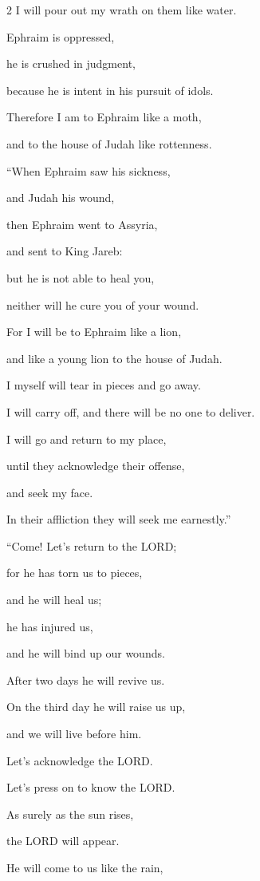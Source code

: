 \begin{multicols}{2}
I will pour out my wrath on them like water.

\myverse{}Ephraim is oppressed,

he is crushed in judgment,

because he is intent in his pursuit of idols.

\myverse{}Therefore I am to Ephraim like a moth,

and to the house of Judah like rottenness.


\vspace{\baselineskip} \myverse{}“When Ephraim saw his sickness,

and Judah his wound,

then Ephraim went to Assyria,

and sent to King Jareb:

but he is not able to heal you,

neither will he cure you of your wound.

\myverse{}For I will be to Ephraim like a lion,

and like a young lion to the house of Judah.

I myself will tear in pieces and go away.

I will carry off, and there will be no one to deliver.

\myverse{}I will go and return to my place,

until they acknowledge their offense,

and seek my face.

In their affliction they will seek me earnestly.”


\mychapter{} \myverse*{}“Come! Let’s return to the LORD;

for he has torn us to pieces,

and he will heal us;

he has injured us,

and he will bind up our wounds.

\myverse{}After two days he will revive us.

On the third day he will raise us up,

and we will live before him.

\myverse{}Let’s acknowledge the LORD.

Let’s press on to know the LORD.

As surely as the sun rises,

the LORD will appear.

He will come to us like the rain,


\end{multicols}
